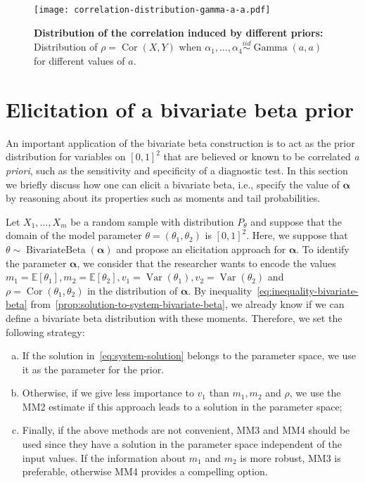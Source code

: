 \documentclass[a4paper, notitlepage, 10pt]{article}
\newcommand{\parameter}{\boldsymbol{\alpha}}
\newcommand{\ev}{\mathbb{E}}
\newcommand{\var}{\operatorname{Var}}
\newcommand{\cor}{\operatorname{Cor}}
\theoremstyle{definition}
\begin{document}
\begin{figure}[!htbp]
    \centering
    \texttt{[image: correlation-distribution-gamma-a-a.pdf]}
    \caption{{\bf Distribution of the correlation induced by different priors:} Distribution of $\rho = \cor(X,Y)$ when $\alpha_1, \dots, \alpha_4 \overset{iid}{\sim} \operatorname{Gamma}(a,a)$ for different values of $a$.}\label{fig:correlation-distribution-gamma-a-a}
\end{figure}

\section{Elicitation of a bivariate beta prior}\label{sec:elicitation}

An important application of the bivariate beta construction is to act as the prior distribution for variables on ${[0, 1]}^2$ that are believed or known to be correlated \textit{a priori}, such as the sensitivity and specificity of a diagnostic test.
In this section we briefly discuss how one can elicit a bivariate beta, i.e., specify the value of $\parameter$ by reasoning about its properties such as moments and tail probabilities.

Let $X_1, \dots, X_m$ be a random sample with distribution $P_{\theta}$ and suppose that the domain of the model parameter $\theta = (\theta_1, \theta_2)$ is ${[0,1]}^2$.
Here, we suppose that $\theta \sim \operatorname{BivariateBeta}(\parameter)$ and propose an elicitation approach for $\parameter$.
To identify the parameter $\parameter$, we consider that the researcher wants to encode the values $m_1 = \ev[\theta_1], m_2 = \ev[\theta_2], v_1 = \var(\theta_1), v_2 = \var(\theta_2)$ and $\rho = \cor(\theta_1, \theta_2)$ in the distribution of $\parameter$.
By inequality~\eqref{eq:inequality-bivariate-beta} from~\autoref{prop:solution-to-system-bivariate-beta}, we already know if we can define a bivariate beta distribution with these moments. 
Therefore, we set the following strategy:

\begin{enumerate}[(a)]
    \item If the solution in~\eqref{eq:system-solution} belongs to the parameter space, we use it as the parameter for the prior. 
    
    \item Otherwise, if we give less importance to $v_1$ than $m_1, m_2$ and $\rho$, we use the MM2 estimate if this approach leads to a solution in the parameter space;
    
    \item Finally, if the above methods are not convenient, MM3 and MM4 should be used since they have a solution in the parameter space independent of the input values. If the information about $m_1$ and $m_2$ is more robust, MM3 is preferable, otherwise MM4 provides a compelling option.
\end{enumerate}
\end{document}
